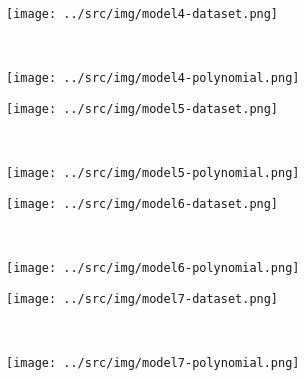 \documentclass[12pt]{article}
\begin{document}
		\begin{figure}
		\begin{minipage}[c]{.5\textwidth}
			\centering
			\texttt{[image: ../src/img/model4-dataset.png]}
			\label{fig:model4-dataset}
		\end{minipage}
		~
		\begin{minipage}[c]{.5\textwidth}
			\centering
			\texttt{[image: ../src/img/model4-polynomial.png]}
			\label{fig:model4-polynomial}
		\end{minipage}
	\end{figure}

		\begin{figure}
		\begin{minipage}[c]{.5\textwidth}
			\centering
			\texttt{[image: ../src/img/model5-dataset.png]}
			\label{fig:model5-dataset}
		\end{minipage}
		~
		\begin{minipage}[c]{.5\textwidth}
			\centering
			\texttt{[image: ../src/img/model5-polynomial.png]}
			\label{fig:model5-polynomial}
		\end{minipage}
	\end{figure}

		\begin{figure}
		\begin{minipage}[c]{.5\textwidth}
			\centering
			\texttt{[image: ../src/img/model6-dataset.png]}
			\label{fig:model6-dataset}
		\end{minipage}
		~
		\begin{minipage}[c]{.5\textwidth}
			\centering
			\texttt{[image: ../src/img/model6-polynomial.png]}
			\label{fig:model6-polynomial}
		\end{minipage}
	\end{figure}

		\begin{figure}
		\begin{minipage}[c]{.5\textwidth}
			\centering
			\texttt{[image: ../src/img/model7-dataset.png]}
			\label{fig:model7-dataset}
		\end{minipage}
		~
		\begin{minipage}[c]{.5\textwidth}
			\centering
			\texttt{[image: ../src/img/model7-polynomial.png]}
			\label{fig:model7-polynomial}
		\end{minipage}
	\end{figure}
\end{document}
